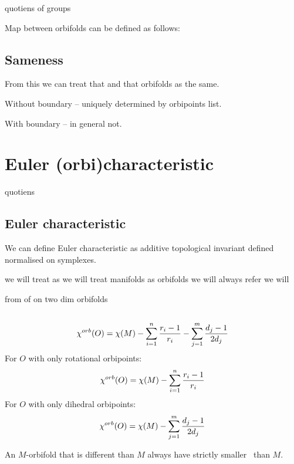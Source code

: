 quotiens of groups 

Map between orbifolds can be defined as follows:
\cite{kleiner2014geometrization}
\subsection{Sameness}
From this we can treat that and that orbifolds as the same.

Without boundary -- uniquely determined by orbipoints list. 

With boundary -- in general not. 

\section{Euler (orbi)characteristic}\label{E_orb}
\label{\Eoc_as_a_sum}
quotiens
\subsection{Euler characteristic}
We can define Euler characteristic as additive topological invariant defined 
normalised on symplexes.

we will treat 
as we will treat manifolds as orbifolds we will always refer 
we will 

from of \Eoc on two dim orbifolds\label{\Eoc on 2d}

\subsection{\Eoc}
\begin{equation}\label{chi orb expression}
{\chi^{orb}(O)} = \chi (M) - \sum_{i=1}^n \frac{r_i-1}{r_i} - \sum_{j=1}^m \frac{d_j-1}{2d_j}
\end{equation}
For $O$ with only rotational orbipoints:
\begin{equation}\label{chi orb expression rotational}
{\chi^{orb}(O)} = \chi (M) - \sum_{i=1}^n \frac{r_i-1}{r_i}
\end{equation}
For $O$ with only dihedral orbipoints:
\begin{equation}\label{chi orb expression dihedral}
{\chi^{orb}(O)} = \chi (M) - \sum_{j=1}^m \frac{d_j-1}{2d_j}
\end{equation}

\begin{observation}\label{orbifolds have smaller Eoc than their base manifolds}
An $M$-orbifold that is different than $M$ always have strictly smaller \Eoc\ than $M$. 
\end{observation}

